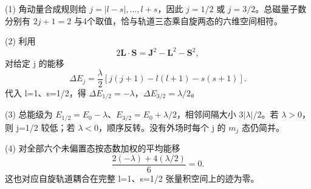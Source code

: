 (1) 角动量合成规则给 \(j=|l-s|,\ldots,l+s\)，因此 \(j=1/2\) 或 \(j=3/2\)。总磁量子数分别有 \(2j+1=2\) 与4个取值，恰与轨道三态乘自旋两态的六维空间相符。

(2) 利用
\[
2\boldsymbol L\cdot\boldsymbol S
=\boldsymbol J^2-\boldsymbol L^2-\boldsymbol S^2,
\]
对给定 j 的能移
\[
\Delta E_j=\frac\lambda2[j(j+1)-l(l+1)-s(s+1)].
\]
代入 l=1、s=1/2，得 \(\Delta E_{1/2}=-\lambda\)，\(\Delta E_{3/2}=\lambda/2\)。

(3) 总能级为 \(E_{1/2}=E_0-\lambda\)、\(E_{3/2}=E_0+\lambda/2\)，相邻间隔大小 \(3|\lambda|/2\)。若 \(\lambda >0\)，则 j=1/2 较低；若 \(\lambda <0\)，顺序反转。没有外场时每个 j 的 \(m_j\) 态仍简并。

(4) 对全部六个未偏置态按态数加权的平均能移
\[
\frac{2(-\lambda)+4(\lambda/2)}{6}=0.
\]
这也对应自旋轨道耦合在完整 l=1、s=1/2 张量积空间上的迹为零。
